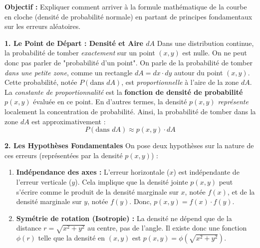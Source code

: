 \begin{proofbox}
\begin{center}
\end{center}

\textbf{Objectif :} Expliquer comment arriver à la formule mathématique de la courbe en cloche (densité de probabilité normale) en partant de principes fondamentaux sur les erreurs aléatoires.

\textbf{1. Le Point de Départ : Densité et Aire $dA$}
Dans une distribution continue, la probabilité de tomber \textit{exactement} sur un point $(x, y)$ est nulle. On ne peut donc pas parler de "probabilité d'un point". On parle de la probabilité de tomber \textit{dans une petite zone}, comme un rectangle $dA = dx \cdot dy$ autour du point $(x, y)$.
Cette probabilité, notée $P(\text{dans } dA)$, est \textit{proportionnelle} à l'aire de la zone $dA$. La \textit{constante de proportionnalité} est la \textbf{fonction de densité de probabilité} $p(x, y)$ évaluée en ce point. En d'autres termes, la densité $p(x, y)$ \textit{représente} localement la concentration de probabilité. Ainsi, la probabilité de tomber dans la zone $dA$ est approximativement :
$$ P(\text{dans } dA) \approx p(x, y) \cdot dA $$

\textbf{2. Les Hypothèses Fondamentales}
On pose deux hypothèses sur la nature de ces erreurs (représentées par la densité $p(x, y)$) :
\begin{enumerate}
    \item \textbf{Indépendance des axes :} L'erreur horizontale ($x$) est indépendante de l'erreur verticale ($y$). Cela implique que la densité jointe $p(x, y)$ peut s'écrire comme le produit de la densité marginale sur $x$, notée $f(x)$, et de la densité marginale sur $y$, notée $f(y)$. Donc, $p(x, y) = f(x) \cdot f(y)$.
    \item \textbf{Symétrie de rotation (Isotropie) :} La densité ne dépend que de la distance $r = \sqrt{x^2 + y^2}$ au centre, pas de l'angle. Il existe donc une fonction $\phi(r)$ telle que la densité en $(x,y)$ est $p(x, y) = \phi(\sqrt{x^2 + y^2})$.
\end{enumerate}


\end{proofbox}
